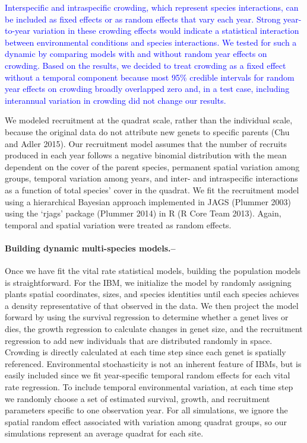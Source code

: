 \documentclass[12pt,]{article}
\begin{document}
\textcolor{blue}{Interspecific and intraspecific crowding, which represent species interactions, can be included as fixed effects or as random effects that vary each year.
Strong year-to-year variation in these crowding effects would indicate a statistical interaction between environmental conditions and species interactions.
We tested for such a dynamic by comparing models with and without random year effects on crowding.
Based on the results, we decided to treat crowding as a fixed effect without a temporal component because most 95\% credible intervals for random year effects on crowding broadly overlapped zero and, in a test case, including interannual variation in crowding did not change our results.}

We modeled recruitment at the quadrat scale, rather than the individual
scale, because the original data do not attribute new genets to specific
parents (Chu and Adler 2015). Our recruitment model assumes that the
number of recruits produced in each year follows a negative binomial
distribution with the mean dependent on the cover of the parent species,
permanent spatial variation among groups, temporal variation among
years, and inter- and intraspecific interactions as a function of total
species' cover in the quadrat. We fit the recruitment model using a
hierarchical Bayesian approach implemented in JAGS (Plummer 2003) using
the `rjags' package (Plummer 2014) in R (R Core Team 2013). Again,
temporal and spatial variation were treated as random effects.

\paragraph{Building dynamic multi-species
models.--}\label{building-dynamic-multi-species-models.}

Once we have fit the vital rate statistical models, building the
population models is straightforward. For the IBM, we initialize the
model by randomly assigning plants spatial coordinates, sizes, and
species identities until each species achieves a density representative
of that observed in the data. We then project the model forward by using
the survival regression to determine whether a genet lives or dies, the
growth regression to calculate changes in genet size, and the
recruitment regression to add new individuals that are distributed
randomly in space. Crowding is directly calculated at each time step
since each genet is spatially referenced. Environmental stochasticity is
not an inherent feature of IBMs, but is easily included since we fit
year-specific temporal random effects for each vital rate regression. To
include temporal environmental variation, at each time step we randomly
choose a set of estimated survival, growth, and recruitment parameters
specific to one observation year. For all simulations, we ignore the
spatial random effect associated with variation among quadrat groups, so
our simulations represent an average quadrat for each site.
\end{document}
